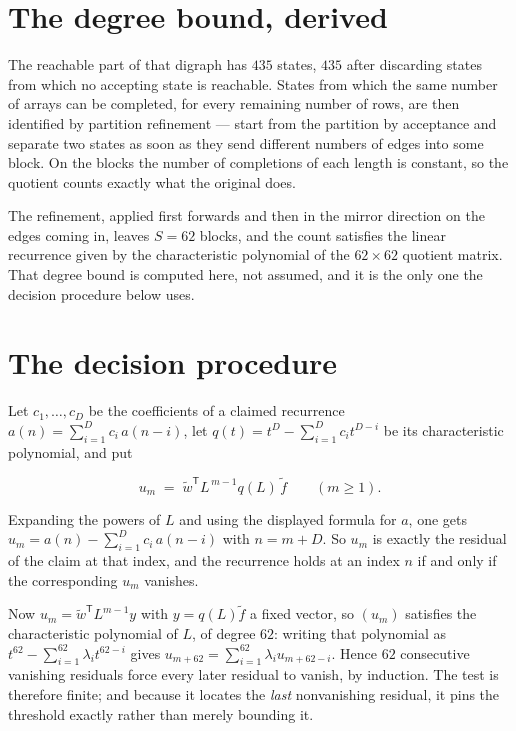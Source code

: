 \documentclass[11pt]{article}
\theoremstyle{definition}
\begin{document}
\section{The degree bound, derived}

The reachable part of that digraph has $435$ states, $435$ after discarding states from which no accepting state is reachable. States from which the same number of arrays can be completed, for every remaining number of rows, are then identified by partition refinement --- start from the partition by acceptance and separate two states as soon as they send different numbers of edges into some block. On the blocks the number of completions of each length is constant, so the quotient counts exactly what the original does.

The refinement, applied first forwards and then in the mirror direction on the edges coming in, leaves $S = 62$ blocks, and the count satisfies the linear recurrence given by the characteristic polynomial of the $62 \times 62$ quotient matrix. That degree bound is computed here, not assumed, and it is the only one the decision procedure below uses.

\section{The decision procedure}

Let $c_1,\dots,c_D$ be the coefficients of a claimed recurrence $a(n) = \sum_{i=1}^{D} c_i\,a(n-i)$, let $q(t) = t^{D} - \sum_{i=1}^{D} c_i t^{D-i}$ be its characteristic polynomial, and put

\[u_m \;=\; \tilde w^{\mathsf T} L^{\,m-1} q(L)\,\tilde f \qquad (m \ge 1).\]

Expanding the powers of $L$ and using the displayed formula for $a$, one gets $u_m = a(n) - \sum_{i=1}^{D} c_i\,a(n-i)$ with $n = m + D$. So $u_m$ is exactly the residual of the claim at that index, and the recurrence holds at an index $n$ if and only if the corresponding $u_m$ vanishes.

Now $u_m = \tilde w^{\mathsf T} L^{m-1} y$ with $y = q(L)\tilde f$ a fixed vector, so $(u_m)$ satisfies the characteristic polynomial of $L$, of degree $62$: writing that polynomial as $t^{62} - \sum_{i=1}^{62} \lambda_i t^{62-i}$ gives $u_{m+62} = \sum_{i=1}^{62} \lambda_i u_{m+62-i}$. Hence $62$ consecutive vanishing residuals force every later residual to vanish, by induction. The test is therefore finite; and because it locates the {\itshape last} nonvanishing residual, it pins the threshold exactly rather than merely bounding it.
\end{document}
